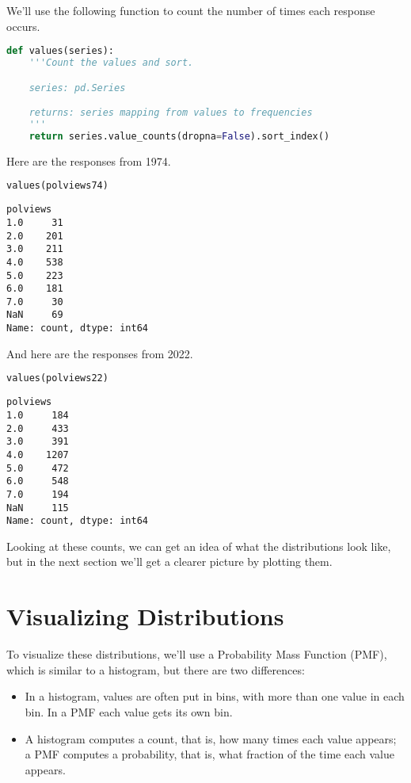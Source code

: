 \pagebreak

We'll use the following function to count the number of times each
response occurs.

\begin{lstlisting}[language=Python,style=source]
def values(series):
    '''Count the values and sort.

    series: pd.Series

    returns: series mapping from values to frequencies
    '''
    return series.value_counts(dropna=False).sort_index()
\end{lstlisting}

Here are the responses from 1974.

\begin{lstlisting}[language=Python,style=source]
values(polviews74)
\end{lstlisting}

\begin{lstlisting}[style=output]
polviews
1.0     31
2.0    201
3.0    211
4.0    538
5.0    223
6.0    181
7.0     30
NaN     69
Name: count, dtype: int64
\end{lstlisting}

And here are the responses from 2022.

\begin{lstlisting}[language=Python,style=source]
values(polviews22)
\end{lstlisting}

\begin{lstlisting}[style=output]
polviews
1.0     184
2.0     433
3.0     391
4.0    1207
5.0     472
6.0     548
7.0     194
NaN     115
Name: count, dtype: int64
\end{lstlisting}

Looking at these counts, we can get an idea of what the distributions
look like, but in the next section we'll get a clearer picture by
plotting them.

\section{Visualizing Distributions}\label{visualizing-distributions}

To visualize these distributions, we'll use a Probability Mass Function
(PMF), which is similar to a histogram, but there are two differences:


\begin{itemize}
\item
  In a histogram, values are often put in bins, with more than one value
  in each bin. In a PMF each value gets its own bin.
\item
  A histogram computes a count, that is, how many times each value
  appears; a PMF computes a probability, that is, what fraction of the
  time each value appears.
\end{itemize}

